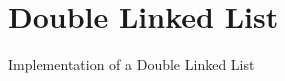\chapter{Double Linked List}
\hypertarget{index}{}\label{index}
Implementation of a Double Linked List 